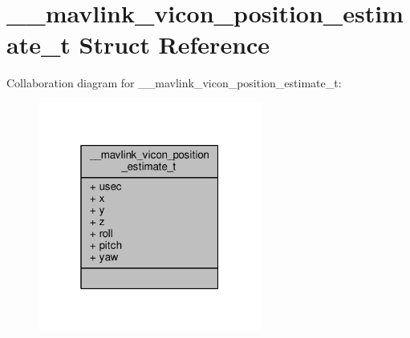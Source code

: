 \hypertarget{struct____mavlink__vicon__position__estimate__t}{\section{\+\_\+\+\_\+mavlink\+\_\+vicon\+\_\+position\+\_\+estimate\+\_\+t Struct Reference}
\label{struct____mavlink__vicon__position__estimate__t}
}


Collaboration diagram for \+\_\+\+\_\+mavlink\+\_\+vicon\+\_\+position\+\_\+estimate\+\_\+t\+:
\nopagebreak
\begin{figure}[H]
\begin{center}
\leavevmode
\includegraphics[width=208pt]{struct____mavlink__vicon__position__estimate__t__coll__graph}
\end{center}
\end{figure}

